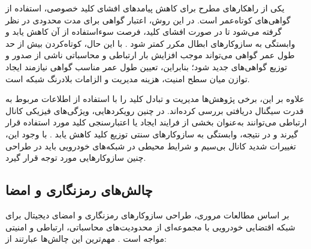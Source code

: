 \documentclass[12pt,a4paper]{article}
\begin{document}
یکی از راهکارهای مطرح برای کاهش پیامدهای افشای کلید خصوصی، استفاده از گواهی‌های کوتاه‌عمر است. در این روش، اعتبار گواهی برای مدت محدودی در نظر گرفته می‌شود تا در صورت افشای کلید، فرصت سوءاستفاده از آن کاهش یابد و وابستگی به سازوکارهای ابطال مکرر کمتر شود \cite{farsimadanReviewSecurityChallenges2025}. با این حال، کوتاه‌کردن بیش از حد طول عمر گواهی می‌تواند موجب افزایش بار ارتباطی و محاسباتی ناشی از صدور و توزیع گواهی‌های جدید شود؛ بنابراین، تعیین طول عمر مناسب گواهی نیازمند ایجاد توازن میان سطح امنیت، هزینه مدیریت و الزامات بلادرنگ شبکه است.

علاوه بر این، برخی پژوهش‌ها مدیریت و تبادل کلید را با استفاده از اطلاعات مربوط به قدرت سیگنال دریافتی بررسی کرده‌اند. در چنین رویکردهایی، ویژگی‌های فیزیکی کانال ارتباطی می‌توانند به‌عنوان بخشی از فرایند ایجاد یا اعتبارسنجی کلید مورد استفاده قرار گیرند و در نتیجه، وابستگی به سازوکارهای سنتی توزیع کلید کاهش یابد \cite{farsimadanReviewSecurityChallenges2025}. با وجود این، تغییرات شدید کانال بی‌سیم و شرایط محیطی در شبکه‌های خودرویی باید در طراحی چنین سازوکارهایی مورد توجه قرار گیرد.

\subsection{چالش‌های رمزنگاری و امضا}

بر اساس مطالعات مروری، طراحی سازوکارهای رمزنگاری و امضای دیجیتال برای شبکه اقتضایی خودرویی با مجموعه‌ای از محدودیت‌های محاسباتی، ارتباطی و امنیتی مواجه است \cite{farsimadanReviewSecurityChallenges2025, rahmawatiagustinaSystematicLiteratureReview2025}. مهم‌ترین این چالش‌ها عبارتند از:
\end{document}
